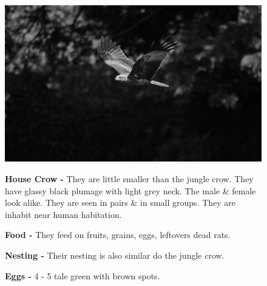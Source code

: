 \begin{figure}[H]
\begin{center}
\includegraphics{figure/Land_birds/01_pariah_kite/pariah-kite.eps}
\end{center}
\medskip
\noindent
{\bf House Crow -} They are little smaller than the jungle crow. They have glassy black plumage with light grey neck. The male \& female look alike. They are seen in pairs \& in small groups. They are inhabit near human habitation.

\medskip
{\bf Food -} They feed on fruits, grains, eggs, leftovers dead rats.

{\bf Nesting -} Their nesting is also similar do the jungle crow.

{\bf Eggs -} 4 - 5 tale green with brown spots.
\end{figure}

\vfill\eject

~\phantom{a}
\vfill

